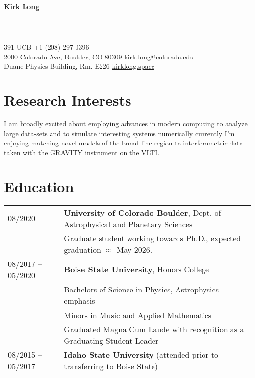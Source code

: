 \documentclass[11pt]{article}
\newcommand{\makeheading}[2]%
        {\begin{minipage}[t]{\textwidth}%
                 {\LARGE \bfseries #1} \\[-0.3\baselineskip]%
                 \rule{\columnwidth}{1.5pt}\\[0.1\baselineskip]
         \end{minipage}}
\begin{document}
\makeheading{Kirk Long}{}

391 UCB				\hfill	+1 (208) 297-0396\\
2000 Colorado Ave, Boulder, CO 80309	\hfill	\href{mailto:kirk.long@colorado.edu}{kirk.long@colorado.edu}\\
Duane Physics Building, Rm. E226			\hfill	\href{https://www.kirklong.space}{kirklong.space}



\section{Research Interests}
 I am broadly excited about employing advances in modern computing to analyze large data-sets and to simulate interesting systems numerically \textemdash currently I'm enjoying matching novel models of the broad-line region to interferometric data taken with the GRAVITY instrument on the VLTI.

\section{Education}
\begin{tabular}{ll}
08/2020 -- & \textbf{University of Colorado Boulder}, Dept. of Astrophysical and Planetary Sciences \\
          & Graduate student working towards Ph.D., expected graduation $\approx$ May 2026. \vspace{1mm}\\
08/2017 -- 05/2020	& 	\textbf{Boise State University}, Honors College \\
			&	Bachelors of Science in Physics, Astrophysics emphasis\\
			&	Minors in Music and Applied Mathematics \\
			&	Graduated Magna Cum Laude with recognition as a Graduating Student Leader \vspace{1mm}\\
08/2015 -- 05/2017 & \textbf{Idaho State University} (attended prior to transferring to Boise State)

\end{tabular}
\end{document}
